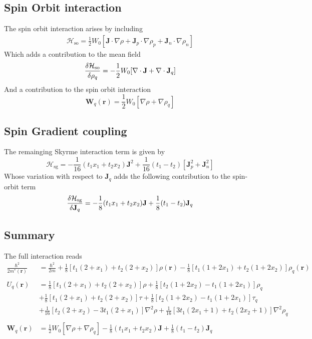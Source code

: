 \subsection{Spin Orbit interaction}
The spin orbit interaction arises by including 
\begin{align}
    \mathcal H_\text{so} = \frac 1 2 W_0[\mathbf J \cdot \nabla \rho + \mathbf J_p \cdot \nabla \rho_p + \mathbf J_n \cdot \nabla \rho_n]
\end{align}
Which adds a contribution to the mean field
\begin{equation}
    \fdv{\mathcal H_\text{so}}{\rho_q} = -\frac 1 2 W_0 [\nabla \cdot \mathbf J + \nabla \cdot \mathbf J_q]
\end{equation}
And a contribution to the spin orbit interaction
\begin{equation}
    \mathbf W_q (\mathbf r ) = \frac 1 2 W_0 [\nabla\rho + \nabla \rho_q]
\end{equation}
\subsection{Spin Gradient coupling}
The remainging Skyrme interaction term is given by
\[
\mathcal H_\text{sg} = -\frac 1 {16} (t_1 x_1 + t_2 x_2) \mathbf J ^2 + \frac 1 {16}(t_1 - t_2) [\mathbf J^2_p + \mathbf J^2_n]
\]
Whose variation with respect to $\mathbf J_q$ adds the following contribution to the spin-orbit term
\[
\fdv{\mathcal H_\text{sg}}{\mathbf J_q} = - \frac 1 8 (t_1 x_1 + t_2 x_2) \mathbf J + \frac 1 8 (t_1 - t_2) \mathbf J_q
\]
\subsection{Summary}
The full interaction reads 
\begin{align*}
    \frac{\hbar^2}{2m^*(\mathbf r)} &= \frac{\hbar^2}{2m} + \frac 1 8 [t_1(2+x_1)+t_2(2+x_2)]\rho(\mathbf r) - \frac 1 8 [t_1(1+2x_1)+t_2(1+2x_2)]\rho_q(\mathbf r ) \\\\
    U_q(\mathbf r) &= \frac 1 8 [t_1(2+x_1)+t_2(2+x_2)]\rho + \frac 1 8 [t_2(1+2x_2)-t_1(1+2x_1)]\rho_q \\
    &+ \frac 1 8 [t_1(2+x_1)+t_2(2+x_2)]\tau + \frac 1 8 [t_2(1+2x_2)-t_1(1+2x_1)]\tau_q \\
    &+ \frac 1 {16} [t_2(2+x_2)-3t_1(2+x_1)] \nabla^2 \rho + \frac 1 {16} [3t_1(2x_1+1)+t_2(2x_2+1)] \nabla^2 \rho_q \\\\
    \mathbf W_q (\mathbf r ) &= \frac 1 2 W_0 [\nabla\rho + \nabla \rho_q] -\frac 1 8 (t_1 x_1 + t_2 x_2) \mathbf J + \frac 1 8 (t_1 - t_2) \mathbf J_q 
\end{align*}


